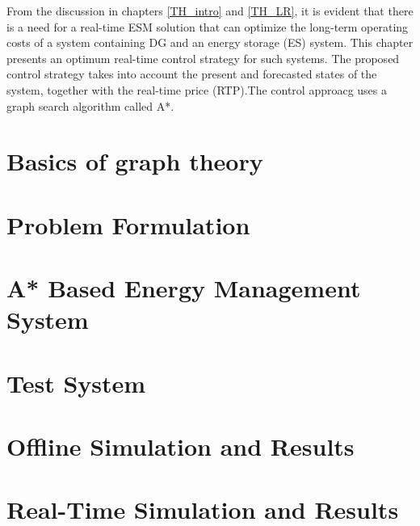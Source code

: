 From the discussion in chapters \ref{TH_intro} and \ref{TH_LR}, it is evident that there is a need for a real-time ESM solution that can optimize the long-term operating costs of a system containing DG and an energy storage (ES) system. This chapter presents an optimum real-time control strategy for such systems. The proposed control strategy takes into account the present and forecasted states of the system, together with the real-time price (RTP).The control approacg uses a graph search algorithm called A*.  

\section{Basics of graph theory}



\section{Problem Formulation} \label{formulation}


\section{A* Based Energy Management System} \label{A*}


\section{Test System} \label{sys}


\section{Offline Simulation and Results} \label{OFF}


\section{Real-Time Simulation and Results} \label{RT}


